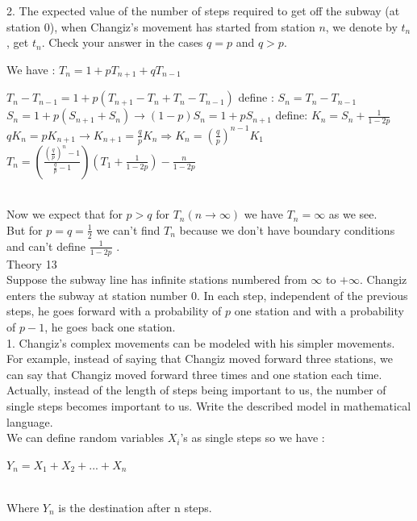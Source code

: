 \documentclass[30pt]{article}
\begin{document}
{\color{blue} {\large 2. }The expected value of the number of steps required to get off the subway (at station 0), when Changiz's movement has started from station $n$, we denote by $t_n$, get $t_n$. Check your answer in the cases $q = p$ and $q > p$. } \\ \newline

We have : \hspace{0.2cm} $T_n = 1 + pT_{n+1} + qT_{n-1} $ \\
\begin{center}
    $T_n - T_{n-1} = 1 + p(T_{n+1} - T_n + T_n - T_{n-1}) $ \hspace{0.05cm} define : $S_n = T_n - T_{n-1} $ \vspace{0.2cm} \\
    $S_n = 1 + p(S_{n+1} + S_n) \rightarrow (1 - p)S_n = 1 + pS_{n+1} $ \hspace{0.05cm} define: $ K_n = S_n + \frac{1}{1 - 2p} $ \vspace{0.2cm} \\
    $qK_n = p K_{n+1} \rightarrow K_{n+1} = \frac{q}{p}K_n \Rightarrow K_n = (\frac{q}{p})^{n-1}K_1 $ \vspace{0.2cm} \\
    $T_n = (\frac{(\frac{q}{p})^n - 1}{\frac{q}{p} - 1})(T_1  + \frac{1}{1-2p}) - \frac{n}{1 - 2p} $ 
\end{center} \\
Now we expect that for $p>q $ for $T_n(n \rightarrow \infty)$ we have $T_n = \infty$ as we see. \\
But for $p = q = \frac{1}{2} $ we can't find $T_n$ because we don't have boundary conditions and can't define $\frac{1}{1 - 2p} $ . \\

{\Large \color{blue} Theory 13 } \\
{\color{blue} Suppose the subway line has infinite stations numbered from $\infty$ to $+\infty$. Changiz enters the subway at station number 0. In each step, independent of the previous steps, he goes forward with a probability of $p$ one station and with a probability of $p − 1$, he goes back one station. } \\ \newline 
{\color{blue} {\large 1. }Changiz's complex movements can be modeled with his simpler movements. For example, instead of saying that Changiz moved forward three stations, we can say that Changiz moved forward three times and one station each time. Actually, instead of the length of steps being important to us, the number of single steps becomes important to us. Write the described model in mathematical language. } \\ \newline 
We can define random variables $X_i$'s as single steps so we have : \\
\begin{center}
    $Y_n = X_1 + X_2 + ... + X_n $
\end{center} \\ 
Where $Y_n$ is the destination after n steps. \\
\end{document}
